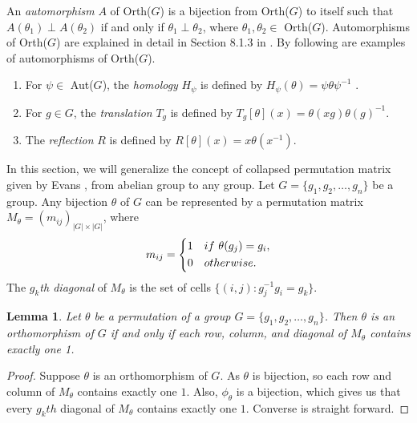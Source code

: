 \documentclass[11pt,a4paper]{article}
\newtheorem{lemma}[theorem]{Lemma}
\theoremstyle{definition}
\theoremstyle{remark}
\begin{document}
	
		An \emph{automorphism} $A$ of Orth($G$) is a bijection from Orth($G$) to itself such that $A(\theta_{1}) \perp A(\theta_{2})$ if and only if $\theta_{1} \perp \theta_{2}$, where $\theta_{1}, \theta_{2} \in$ Orth($G$). Automorphisms of Orth($G$) are explained in detail in Section 8.1.3 in \cite{evans}. By \cite[Theorem 8.6, p. 206]{evans} following are examples of automorphisms of Orth($G$).
	\begin{enumerate}
		\item [(i)] For $\psi \in$ Aut($G$), the \textit{homology} $H_{\psi}$ is defined by $H_{\psi}(\theta) = \psi\theta \psi^{-1}$ .
		\item[(ii)] For $g \in G$, the \textit{translation} $T_{g}$ is defined by $T_{g}[\theta](x) = \theta(xg)\theta(g)^{-1}$.
		\item[(iii)] The \textit{reflection} $R$ is defined by $R[\theta](x) = x \theta(x^{-1})$.
	\end{enumerate}
	In this section, we will generalize the concept of collapsed permutation matrix given by Evans \cite{evans2}, from abelian group to any group.
	Let $G=\{g_1,g_2,\ldots,g_n\}$ be a group. Any bijection $\theta$ of $G$ can be represented by a permutation matrix $M_{\theta} = (m_{ij})_{|G| \times |G|}$, where 
	$$ m_{ij} =
	\begin{dcases}
		1 & if~\theta(g_j) = g_i,\\
		0 & otherwise.
	\end{dcases}$$
	The \emph{$g_k$th diagonal} of $M_{\theta}$ is the set of cells $\{(i,j) : g_{j}^{-1}g_{i} = g_k\}$.
	
	\begin{lemma}\label{le1}
		Let $\theta$ be a permutation of a group $G=\{g_1,g_2,\ldots,g_n\}$. Then $\theta$ is an orthomorphism of $G$ if and only if each row, column, and diagonal of $M_{\theta}$ contains exactly one 1. 
	\end{lemma}
	\begin{proof}
		Suppose $\theta$ is an orthomorphism of $G$. As $\theta$ is bijection, so each row and column of $M_{\theta}$ contains exactly one $1$. Also, $\phi_{\theta}$ is a bijection, which gives us that every $g_{k}{th}$ diagonal of $M_{\theta}$ contains exactly one $1$. Converse is straight forward.
	\end{proof}
\end{document}
